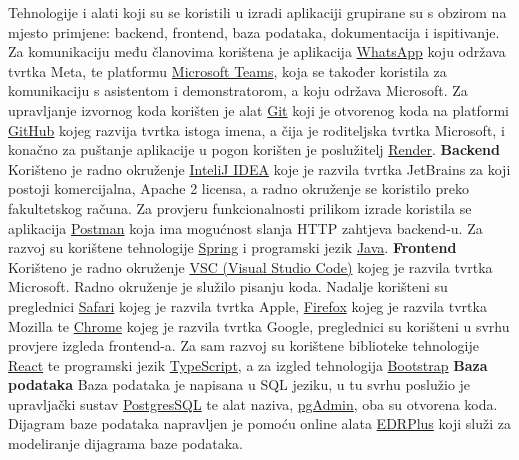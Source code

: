 			 Tehnologije i alati koji su se koristili u izradi aplikaciji grupirane su s obzirom na mjesto primjene: backend, frontend, baza podataka, dokumentacija i ispitivanje. Za komunikaciju među članovima korištena je aplikacija \href{https://www.whatsapp.com/}{WhatsApp} koju održava tvrtka Meta, te platformu \href{https://support.microsoft.com/en-us/topic/what-is-microsoft-teams-3de4d369-0167-8def-b93b-0eb5286d7a29}{Microsoft Teams}, koja se također koristila za komunikaciju s asistentom i demonstratorom, a koju održava Microsoft. Za upravljanje izvornog koda korišten je alat \href{https://git-scm.com/}{Git} koji je otvorenog koda na platformi \href{https://github.com/}{GitHub} kojeg razvija tvrtka istoga imena, a čija je roditeljska tvrtka Microsoft, i konačno za puštanje aplikacije u pogon korišten je poslužitelj \href{https://render.com/}{Render}.
			 \newline \textbf{Backend} \newline
			 Korišteno je radno okruženje \href{https://www.jetbrains.com/idea/}{InteliJ IDEA}  koje je razvila tvrtka JetBrains za koji postoji komercijalna, Apache 2 licensa, a radno okruženje se koristilo preko fakultetskog računa. Za provjeru funkcionalnosti prilikom izrade koristila se aplikacija \href{https://www.postman.com/}{Postman} koja ima mogućnost slanja HTTP zahtjeva backend-u. Za razvoj su korištene tehnologije \href{https://spring.io/}{Spring} i programski jezik \href{https://www.java.com/en/}{Java}.
			 \newline \textbf{Frontend} \newline
			 Korišteno je radno okruženje \href{https://code.visualstudio.com/download}{VSC (Visual Studio Code)} kojeg je razvila tvrtka Microsoft. Radno okruženje je služilo pisanju koda. Nadalje korišteni su preglednici \href{https://www.apple.com/safari/}{Safari} kojeg je razvila tvrtka Apple, \href{https://www.mozilla.org/en-US/firefox/new/}{Firefox} kojeg je razvila tvrtka Mozilla te \href{https://www.google.com/chrome/}{Chrome} kojeg je razvila tvrtka Google, preglednici su korišteni u svrhu provjere izgleda frontend-a. Za sam razvoj su korištene biblioteke tehnologije \href{https://react.dev/}{React} te programski jezik \href{https://www.typescriptlang.org/}{TypeScript}, a za izgled tehnologija \href{https://getbootstrap.com/}{Bootstrap}
			 \newline \textbf{Baza podataka} \newline
			 Baza podataka je napisana u SQL jeziku, u tu svrhu poslužio je upravljački sustav \href{https://www.postgresql.org/}{PostgresSQL} te alat naziva,  \href{https://www.pgadmin.org/}{pgAdmin}, oba su otvorena koda. Dijagram baze podataka napravljen je pomoću online alata \href{https://erdplus.com/}{EDRPlus} koji služi za modeliranje dijagrama baze podataka.
